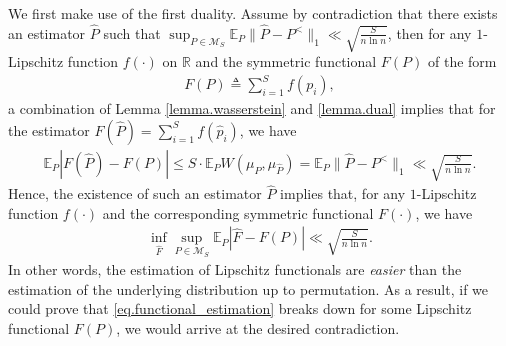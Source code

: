 \documentclass[final,12pt]{colt2018} %
\def \bE {\mathbb{E}}
\newcommand{\calM}{{\mathcal{M}}}
\begin{document}
We first make use of the first duality. Assume by contradiction that there exists an estimator $\hat{P}$ such that $\sup_{P\in\calM_S} \bE_P\|\hat{P}-P^<\|_1\ll \sqrt{\frac{S}{n\ln n}}$, then for any $1$-Lipschitz function $f(\cdot)$ on $\mathbb{R}$ and the symmetric functional $F(P)$ of the form
\begin{align*}
F(P) \triangleq \sum_{i=1}^S f(p_i),
\end{align*}
a combination of Lemma \ref{lemma.wasserstein} and \ref{lemma.dual} implies that for the estimator $F(\hat{P})=\sum_{i=1}^S f(\hat{p}_i)$, we have
\begin{align*}
\bE_P|F(\hat{P}) - F(P)| \le S\cdot \bE_PW(\mu_P,\mu_{\hat{P}}) = \bE_P\|\hat{P}-P^<\|_1 \ll \sqrt{\frac{S}{n\ln n}}.
\end{align*}
Hence, the existence of such an estimator $\hat{P}$ implies that, for any $1$-Lipschitz function $f(\cdot)$ and the corresponding symmetric functional $F(\cdot)$, we have
\begin{align}\label{eq.functional_estimation}
\inf_{\hat{F}} \sup_{P\in\calM_S} \bE_P |\hat{F}-F(P)| \ll \sqrt{\frac{S}{n\ln n}}.
\end{align}
In other words, the estimation of Lipschitz functionals are \emph{easier} than the estimation of the underlying distribution up to permutation. As a result, if we could prove that \eqref{eq.functional_estimation} breaks down for some Lipschitz functional $F(P)$, we would arrive at the desired contradiction.
\end{document}
